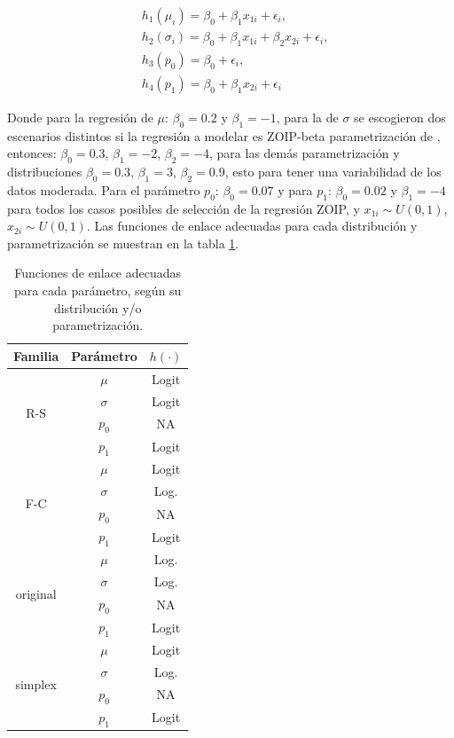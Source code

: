 \begin{equation}
\begin{split}
&h_1(\mu_{i})=\beta_0+\beta_1x_{1i}+\epsilon_i,\\
&h_2(\sigma_{i})=\beta_0+\beta_1x_{1i}+\beta_2x_{2i}+\epsilon_i,\\
&h_3(p_0)=\beta_0+\epsilon_i,\\
&h_4(p_1) =\beta_0+\beta_1x_{2i}+\epsilon_i
\end{split}
\label{S_eq_reg}
\end{equation}

Donde para la regresi\'{o}n de $\mu$: $\beta_0=0.2$ y $\beta_1=-1$, para la de $\sigma$ se escogieron dos escenarios distintos si la regresi\'{o}n a modelar es ZOIP-beta parametrizaci\'{o}n de \cite{Stasinopoulos2}, entonces: $\beta_0=0.3$, $\beta_1=-2$, $\beta_2=-4$, para las dem\'{a}s parametrizaci\'{o}n y distribuciones $\beta_0=0.3$, $\beta_1=3$, $\beta_2=0.9$, esto para tener una variabilidad de los datos moderada. Para el par\'{a}metro $p_0$: $\beta_0=0.07$ y para $p_1$: $\beta_0=0.02$ y $\beta_1=-4$ para todos los casos posibles de selecci\'{o}n de la regresi\'{o}n ZOIP, y $x_{1i} \sim U(0,1)$, $x_{2i} \sim U(0,1)$. Las funciones de enlace adecuadas para cada distribuci\'{o}n y parametrizaci\'{o}n se muestran en la tabla \ref{T_F_enlace}.\\

\begin{table}[!hbt]
{\scriptsize
\begin{center}
\begin{tabular}{|c|c|c|}\hline
Familia & Par\'{a}metro & $h(\cdot)$ \\ \hline
\multirow{4}{*}{R-S} & $\mu$ & Logit \\
 & $\sigma$ & Logit \\
 & $p_0$ & NA \\
 & $p_1$ & Logit \\ \hline

\multirow{4}{*}{F-C} & $\mu$ & Logit \\
 & $\sigma$ & Log. \\
 & $p_0$ & NA \\
 & $p_1$ & Logit \\ \hline

\multirow{4}{*}{original} & $\mu$ & Log. \\
 & $\sigma$ & Log. \\
 & $p_0$ & NA \\
 & $p_1$ & Logit \\ \hline

\multirow{4}{*}{simplex} & $\mu$ & Logit \\
 & $\sigma$ & Log. \\
 & $p_0$ & NA \\
 & $p_1$ & Logit \\ \hline

\end{tabular}
\caption{Funciones de enlace adecuadas para cada par\'{a}metro, seg\'{u}n su distribuci\'{o}n y/o parametrizaci\'{o}n.}
\label{T_F_enlace}
\end{center}
}
\end{table}

